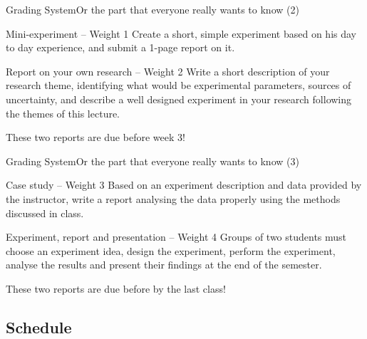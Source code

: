 \documentclass[t]{beamer}
\begin{document}
\begin{ftst}
  {Grading System}{Or the part that everyone really wants to know (2)}
  \begin{block}{Mini-experiment -- Weight 1}
    Create a short, simple experiment based on his day to day
    experience, and submit a 1-page report on it.
  \end{block}
  \begin{block}{Report on your own research -- Weight 2}
    Write a short description of your research theme, identifying
    what would be experimental parameters, sources of uncertainty, and
    describe a well designed experiment in your research following the
    themes of this lecture.
  \end{block}

  \vone

  These two reports are due before week 3!
\end{ftst}



\begin{ftst}
  {Grading System}{Or the part that everyone really wants to know (3)}
  \begin{block}{Case study -- Weight 3}
    Based on an experiment description and data provided by the
    instructor, write a report analysing the data properly using the
    methods discussed in class.
  \end{block}
  \begin{block}{Experiment, report and presentation -- Weight 4}
    Groups of two students must choose an experiment idea, design the
    experiment, perform the experiment, analyse the results and
    present their findings at the end of the semester.
  \end{block}

  \vone

  These two reports are due before by the last class!
\end{ftst}

\subsection{Schedule}
\end{document}
